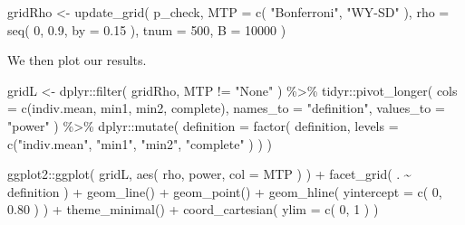 \documentclass{article}
\newenvironment{Shaded}{\begin{snugshade}}{\end{snugshade}}
\newcommand{\AttributeTok}[1]{\textcolor[rgb]{0.77,0.63,0.00}{#1}}
\newcommand{\DecValTok}[1]{\textcolor[rgb]{0.00,0.00,0.81}{#1}}
\newcommand{\FloatTok}[1]{\textcolor[rgb]{0.00,0.00,0.81}{#1}}
\newcommand{\FunctionTok}[1]{\textcolor[rgb]{0.00,0.00,0.00}{#1}}
\newcommand{\NormalTok}[1]{#1}
\newcommand{\OtherTok}[1]{\textcolor[rgb]{0.56,0.35,0.01}{#1}}
\newcommand{\SpecialCharTok}[1]{\textcolor[rgb]{0.00,0.00,0.00}{#1}}
\newcommand{\StringTok}[1]{\textcolor[rgb]{0.31,0.60,0.02}{#1}}
\begin{document}
\begin{Shaded}
\begin{Highlighting}[]
\NormalTok{gridRho }\OtherTok{\textless{}{-}} \FunctionTok{update\_grid}\NormalTok{( p\_check,}
              \AttributeTok{MTP =} \FunctionTok{c}\NormalTok{( }\StringTok{"Bonferroni"}\NormalTok{, }\StringTok{"WY{-}SD"}\NormalTok{ ),}
              \AttributeTok{rho =} \FunctionTok{seq}\NormalTok{( }\DecValTok{0}\NormalTok{, }\FloatTok{0.9}\NormalTok{, }\AttributeTok{by =} \FloatTok{0.15}\NormalTok{ ),}
              \AttributeTok{tnum =} \DecValTok{500}\NormalTok{,}
              \AttributeTok{B =} \DecValTok{10000}\NormalTok{ )}
\end{Highlighting}
\end{Shaded}

We then plot our results.

\begin{Shaded}
\begin{Highlighting}[]
\NormalTok{gridL }\OtherTok{\textless{}{-}}\NormalTok{ dplyr}\SpecialCharTok{::}\FunctionTok{filter}\NormalTok{( gridRho, MTP }\SpecialCharTok{!=} \StringTok{"None"}\NormalTok{ ) }\SpecialCharTok{\%\textgreater{}\%}
\NormalTok{  tidyr}\SpecialCharTok{::}\FunctionTok{pivot\_longer}\NormalTok{( }\AttributeTok{cols =} \FunctionTok{c}\NormalTok{(indiv.mean, min1, min2, complete),}
                         \AttributeTok{names\_to =} \StringTok{"definition"}\NormalTok{, }\AttributeTok{values\_to =} \StringTok{"power"}\NormalTok{ ) }\SpecialCharTok{\%\textgreater{}\%}
\NormalTok{  dplyr}\SpecialCharTok{::}\FunctionTok{mutate}\NormalTok{( }\AttributeTok{definition =} \FunctionTok{factor}\NormalTok{( definition,}
          \AttributeTok{levels =} \FunctionTok{c}\NormalTok{(}\StringTok{"indiv.mean"}\NormalTok{, }\StringTok{"min1"}\NormalTok{, }\StringTok{"min2"}\NormalTok{, }\StringTok{"complete"}\NormalTok{ ) ) )}

\NormalTok{ggplot2}\SpecialCharTok{::}\FunctionTok{ggplot}\NormalTok{( gridL, }\FunctionTok{aes}\NormalTok{( rho, power, }\AttributeTok{col =}\NormalTok{ MTP ) ) }\SpecialCharTok{+}
  \FunctionTok{facet\_grid}\NormalTok{( . }\SpecialCharTok{\textasciitilde{}}\NormalTok{ definition ) }\SpecialCharTok{+}
  \FunctionTok{geom\_line}\NormalTok{() }\SpecialCharTok{+} \FunctionTok{geom\_point}\NormalTok{() }\SpecialCharTok{+}
  \FunctionTok{geom\_hline}\NormalTok{( }\AttributeTok{yintercept =} \FunctionTok{c}\NormalTok{( }\DecValTok{0}\NormalTok{, }\FloatTok{0.80}\NormalTok{ ) ) }\SpecialCharTok{+} 
  \FunctionTok{theme\_minimal}\NormalTok{() }\SpecialCharTok{+}
  \FunctionTok{coord\_cartesian}\NormalTok{( }\AttributeTok{ylim =} \FunctionTok{c}\NormalTok{( }\DecValTok{0}\NormalTok{, }\DecValTok{1}\NormalTok{ ) )}
\end{Highlighting}
\end{Shaded}
\end{document}
